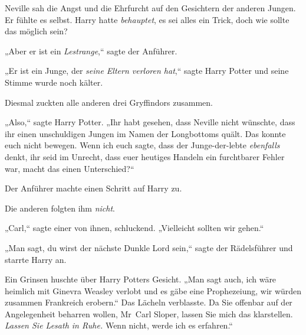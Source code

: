 Neville sah die Angst und die Ehrfurcht auf den Gesichtern der anderen Jungen. Er fühlte es selbst. Harry hatte \emph{behauptet}, es sei alles ein Trick, doch wie sollte das möglich sein?

„Aber er ist ein \emph{Lestrange},“ sagte der Anführer.

„Er ist ein Junge, der \emph{seine Eltern verloren hat},“ sagte Harry Potter und seine Stimme wurde noch kälter.

Diesmal zuckten alle anderen drei Gryffindors zusammen.

„Also,“ sagte Harry Potter. „Ihr habt gesehen, dass Neville nicht wünschte, dass ihr einen unschuldigen Jungen im Namen der Longbottoms quält. Das konnte euch nicht bewegen. Wenn ich euch sagte, dass der Junge-der-lebte \emph{ebenfalls} denkt, ihr seid im Unrecht, dass euer heutiges Handeln ein furchtbarer Fehler war, macht das einen Unterschied?“

Der Anführer machte einen Schritt auf Harry zu.

Die anderen folgten ihm \emph{nicht}.

„Carl,“ sagte einer von ihnen, schluckend. „Vielleicht sollten wir gehen.“

„Man sagt, du wirst der nächste Dunkle Lord sein,“ sagte der Rädelsführer und starrte Harry an.

Ein Grinsen huschte über Harry Potters Gesicht. „Man sagt auch, ich wäre heimlich mit Ginevra Weasley verlobt und es gäbe eine Prophezeiung, wir würden zusammen Frankreich erobern.“ Das Lächeln verblasste. Da Sie offenbar auf der Angelegenheit beharren wollen, Mr~Carl Sloper, lassen Sie mich das klarstellen. \emph{Lassen Sie Lesath in Ruhe.} Wenn nicht, werde ich es erfahren.“

